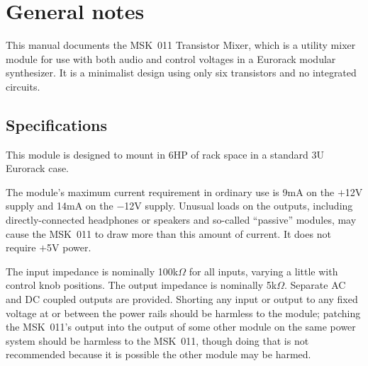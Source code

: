 
%
%
%
%
%
%

\chapter{General notes}

This manual documents the MSK~011 Transistor Mixer, which is a
utility mixer module for use with both audio and control voltages
in a Eurorack modular synthesizer. 
It is a minimalist design using only six transistors and no integrated
circuits.

\section{Specifications}

This module is designed to mount in 6HP of rack space in a standard 3U
Eurorack case.

The module's maximum current requirement in ordinary use is 9mA on the
$+$12V supply and 14mA on the $-$12V supply.
Unusual loads on the outputs, including directly-connected headphones or
speakers and so-called ``passive'' modules, may cause the MSK~011 to draw
more than this amount of current.
It does not require $+$5V power.

The input impedance is nominally 100k$\Omega$ for all inputs, varying a
little with control knob positions.  The output impedance is nominally
5k$\Omega$.  Separate AC and DC coupled outputs are provided.  Shorting any
input or output to any fixed voltage at or between the power rails should be
harmless to the module; patching the MSK~011's output into the output of
some other module on the same power system should be harmless to the
MSK~011, though doing that is not recommended because it is possible the
other module may be harmed.

